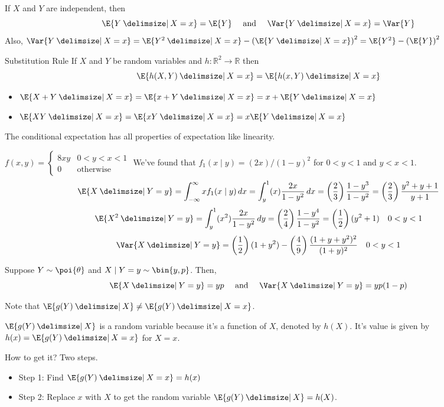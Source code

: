 \begin{Example}{}{}
    If $ X $ and $ Y $ are independent, then
    \[ \E{Y\given X=x}=\E{Y}\quad\text{ and }\quad \Var{Y\given X=x}=\Var{Y} \]
    Also, $ \Var{Y\given X=x}=\E{Y^2\given X=x}-\left( \E{Y\given X=x} \right)^2=
        \E{Y^2}-\left( \E{Y} \right)^2 $
\end{Example}
\begin{Theorem}{Substitution Rule}{}
    If $ X $ and $ Y $
    be random variables and $ h:\mathbb{R}^2\to \mathbb{R} $ then
    \[ \E{h(X,Y)\given X=x}=\E{h(x,Y)\given X=x} \]
\end{Theorem}
\begin{Example}{}{}
    \begin{itemize}
        \item $ \E{X+Y\given X=x}=\E{x+Y\given X=x}=x+\E{Y\given X=x} $
        \item $ \E{XY\given X=x}=\E{xY\given X=x}=x\E{Y\given X=x} $
    \end{itemize}
\end{Example}
\begin{Theorem}{}{}
    The conditional expectation has all properties of expectation like
    linearity.
\end{Theorem}
\begin{Example}{}{}
    $ \displaystyle f(x,y)=\begin{cases}
            8 x y & 0<y<x<1          \\
            0     & \text{otherwise}
        \end{cases} $
    We've found that $ f_1(x\mid y)=(2x)/(1-y)^2 $ for $ 0<y<1 $ and $ y<x<1 $.
    \[ \E{X\given Y=y}=\int_{-\infty}^{\infty} x f_1(x\mid y)\, d{x}=
        \int_{y}^{1} (x) \frac{2x}{1-y^2}\, d{x}=\left( \frac{2}{3} \right)
        \frac{1-y^3}{1-y^2}=\left( \frac{2}{3}  \right)
        \frac{y^2+y+1}{y+1}   \]
    \[ \E{X^2\given Y=y}=\int_{y}^{1} (x^2)
        \frac{2x}{1-y^2} \, d{y}=\left( \frac{2}{4} \right)
        \frac{1-y^4}{1-y^2}=\left( \frac{1}{2}  \right)(y^2+1)\quad 0<y<1 \]
    \[ \Var{X\given Y=y}=\left( \frac{1}{2} \right) (1+y^2)-
        \left( \frac{4}{9}  \right)\frac{(1+y+y^2)^2}{(1+y)^2}\quad 0<y<1  \]
\end{Example}
\begin{Example}{}{}
    Suppose $ Y \sim \poi{\theta} $ and $ X\mid Y=y \sim \bin{y,p} $. Then,
    \[ \E{X\given Y=y}=yp\quad\text{ and }\quad\Var{X\given Y=y}=yp(1-p) \]
\end{Example}
\begin{Remark}{}{}
    Note that $ \E{g(Y)\given X}\neq \E{g(Y)\given X=x} $.

    $ \E{g(Y)\given X} $ is a random variable because it's a function
    of $ X $, denoted by $ h(X) $. It's value is given by $ h(x)=
        \E{g(Y)\given X=x} $ for $ X=x $.

    How to get it? Two steps.
    \begin{itemize}
        \item Step 1: Find $ \E{g(Y)\given X=x}=h(x) $
        \item Step 2: Replace $ x $ with
              $ X $ to get the random variable $ \E{g(Y)\given X}=h(X) $.
    \end{itemize}
\end{Remark}

